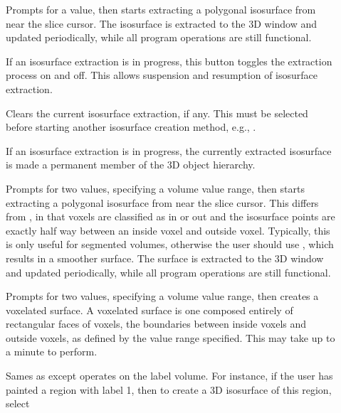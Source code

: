 \begin{description}
\item[]  Prompts for a
    value, then starts extracting a polygonal isosurface from near the slice
    cursor.  The isosurface is extracted to the 3D window and updated
    periodically, while all program operations are still functional.
\item[]  If an isosurface extraction
    is in progress, this button toggles the extraction process on and
    off.  This allows suspension and resumption of isosurface extraction.
\item[]  Clears the current
    isosurface extraction, if any.  This must be selected before starting
    another isosurface creation method, e.g.,
    .
\item[]  If an isosurface extraction
    is in progress, the currently extracted isosurface is made a permanent
    member of the 3D object hierarchy.
\item[]  Prompts for two
    values, specifying a volume value range, then starts extracting a
    polygonal isosurface from near the slice
    cursor.  This differs from ,
    in that voxels are classified as in or out and the isosurface points are
    exactly half way between an inside voxel and outside voxel.  Typically,
    this is only useful for segmented volumes, otherwise the user
    should use , which
    results in a smoother surface.
    The surface is extracted to the 3D window and updated
    periodically, while all program operations are still functional.
\item[]  Prompts for two
    values, specifying a volume value range, then creates a voxelated
    surface.  A voxelated surface is one composed entirely of rectangular
    faces of voxels, the boundaries between inside voxels and outside
    voxels, as defined by the value range specified.  This may take
    up to a minute to perform.
\item[]  Sames as
     except operates on
    the label volume.  For instance, if the user has painted a region
    with label 1, then to create a 3D isosurface of this region, select

\end{description}
